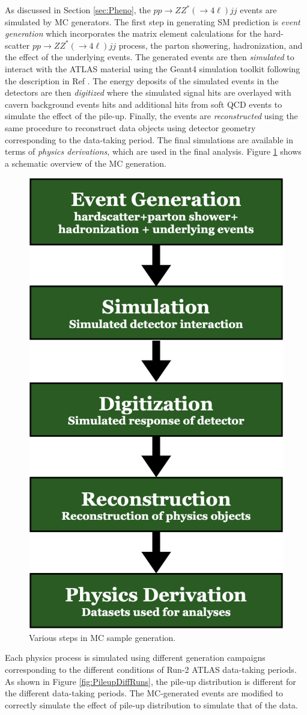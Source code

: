 As discussed in Section \ref{sec:Pheno}, the $pp \rightarrow ZZ^* (\rightarrow 4\ell) jj$ events are simulated by MC generators. The first step in generating SM prediction is \textit{event generation} which incorporates the matrix element calculations for the hard-scatter $pp \rightarrow ZZ^* (\rightarrow 4\ell) jj$ process, the parton showering, hadronization, and the effect of the underlying events. The generated events are then \textit{simulated} to interact with the ATLAS material using the Geant4 simulation toolkit following the description in Ref \cite{GEANT4}. The energy deposits of the simulated events in the detectors are then \textit{digitized} where the simulated signal hits are overlayed with cavern background events hits and additional hits from soft QCD events to simulate the effect of the pile-up. Finally, the events are \textit{reconstructed} using the same procedure to reconstruct data objects using detector geometry corresponding to the data-taking period. The final simulations are available in terms of \textit{physics derivations}, which are used in the final analysis. Figure \ref{fig:MCGenerationSchematic} shows a schematic overview of the MC generation. 
\begin{figure}[!htbp]
\centering
\includegraphics[width=.3\linewidth]{figures/AnalysisOverview/MCSchematic.png}  
  \caption{Various steps in MC sample generation.}
\label{fig:MCGenerationSchematic}
\end{figure}

Each physics process is simulated using different generation campaigns corresponding to the different conditions of Run-2 ATLAS data-taking periods. As shown in Figure \ref{fig:PileupDiffRuns}, the pile-up distribution is different for the different data-taking periods. The MC-generated events are modified to correctly simulate the effect of pile-up distribution to simulate that of the data. 

